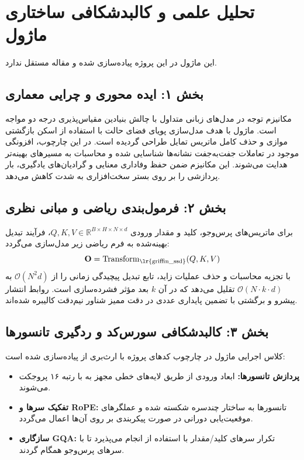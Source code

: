 \section{تحلیل علمی و کالبدشکافی ساختاری ماژول }

این ماژول در این پروژه پیاده‌سازی شده و مقاله مستقل ندارد.
\label{sec:griffin_ssd}

\subsection*{بخش ۱: ایده محوری و چرایی معماری }
مکانیزم توجه در مدل‌های زبانی متداول با چالش بنیادین مقیاس‌پذیری درجه دو مواجه است. ماژول  با هدف مدل‌سازی پویای فضای حالت با استفاده از اسکن بازگشتی موازی و حذف کامل ماتریس تمایل طراحی گردیده است. در این چارچوب، افزونگی موجود در تعاملات جفت‌به‌جفت نشانه‌ها شناسایی شده و محاسبات به مسیرهای بهینه‌تر هدایت می‌شوند. این مکانیزم ضمن حفظ وفاداری معنایی و گرادیان‌های یادگیری، بار پردازشی را بر روی بستر سخت‌افزاری به شدت کاهش می‌دهد.

\subsection*{بخش ۲: فرمول‌بندی ریاضی و مبانی نظری }
برای ماتریس‌های پرس‌وجو، کلید و مقدار ورودی $Q, K, V \in \mathbb{R}^{B \times H \times N \times d}$، فرآیند تبدیل بهینه‌شده به فرم ریاضی زیر مدل‌سازی می‌گردد:
\begin{equation}
\mathbf{O} = \operatorname{Transform}_{\text{\lr{griffin\_ssd}}}(Q, K, V)
\end{equation}
با تجزیه محاسبات و حذف عملیات زاید، تابع تبدیل پیچیدگی زمانی را از $\mathcal{O}(N^2 d)$ به $\mathcal{O}(N \cdot k \cdot d)$ تقلیل می‌دهد که در آن $k$ بعد مؤثر فشرده‌سازی است. روابط انتشار پیشرو و برگشتی با تضمین پایداری عددی در دقت ممیز شناور نیم‌دقت  کالیبره شده‌اند.

\subsection*{بخش ۳: کالبدشکافی سورس‌کد و ردگیری تانسورها }
کلاس اجرایی ماژول در چارچوب کدهای پروژه با ارث‌بری از  پیاده‌سازی شده است:
\begin{itemize}
    \item \textbf{پردازش تانسورها:} ابعاد ورودی \lr{$[B, N, D]$} از طریق لایه‌های خطی مجهز به  با رتبه ۱۶ پروجکت می‌شوند.
    \item \textbf{تفکیک سرها و RoPE:} تانسورها به ساختار چندسره \lr{$[B, H, N, d]$} شکسته شده و عملگرهای موقعیت‌یابی دورانی در صورت پیکربندی بر روی آن‌ها اعمال می‌گردد.
    \item \textbf{سازگاری GQA:} تکرار سرهای کلید/مقدار با استفاده از  انجام می‌پذیرد تا با سرهای پرس‌وجو همگام گردند.
\end{itemize}

